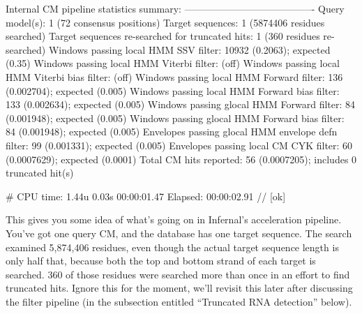 \begin{sreoutput}
Internal CM pipeline statistics summary:
----------------------------------------
Query model(s):                                                  1  (72 consensus positions)
Target sequences:                                                1  (5874406 residues searched)
Target sequences re-searched for truncated hits:                 1  (360 residues re-searched)
Windows   passing  local HMM SSV           filter:           10932  (0.2063); expected (0.35)
Windows   passing  local HMM Viterbi       filter:                  (off)
Windows   passing  local HMM Viterbi  bias filter:                  (off)
Windows   passing  local HMM Forward       filter:             136  (0.002704); expected (0.005)
Windows   passing  local HMM Forward  bias filter:             133  (0.002634); expected (0.005)
Windows   passing glocal HMM Forward       filter:              84  (0.001948); expected (0.005)
Windows   passing glocal HMM Forward  bias filter:              84  (0.001948); expected (0.005)
Envelopes passing glocal HMM envelope defn filter:              99  (0.001331); expected (0.005)
Envelopes passing  local CM  CYK           filter:              60  (0.0007629); expected (0.0001)
Total CM hits reported:                                         56  (0.0007205); includes 0 truncated hit(s)

# CPU time: 1.44u 0.03s 00:00:01.47 Elapsed: 00:00:02.91
//
[ok]
\end{sreoutput}

This gives you some idea of what's going on in Infernal's acceleration
pipeline. You've got one query CM, and the database has one target
sequence. The search examined 5,874,406 residues, even though the
actual target sequence length is only half that, because both the top
and bottom strand of each target is searched. 360 of those residues
were searched more than once in an effort to find truncated
hits. Ignore this for the moment, we'll revisit this later after
discussing the filter pipeline (in the subsection entitled ``Truncated
RNA detection'' below).

